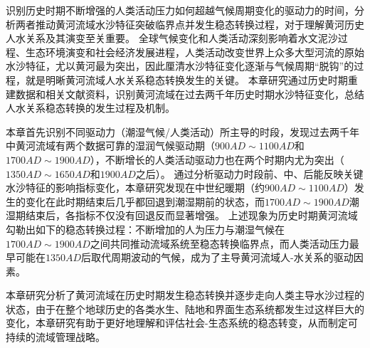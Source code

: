 识别历史时期不断增强的人类活动压力如何超越气候周期变化的驱动力的时间，分析两者推动黄河流域水沙特征突破临界点并发生稳态转换过程，对于理解黄河历史人水关系及其演变至关重要。
全球气候变化和人类活动深刻影响着水文泥沙过程、生态环境演变和社会经济发展进程，人类活动改变世界上众多大型河流的原始水沙特征，尤以黄河最为突出，因此厘清水沙特征变化逐渐与气候周期“脱钩”的过程，就是明晰黄河流域人水关系稳态转换发生的关键。
本章研究通过历史时期重建数据和相关文献资料，识别黄河流域在过去两千年历史时期水沙特征变化，总结人水关系稳态转换的发生过程及机制。

本章首先识别不同驱动力（潮湿气候/人类活动）所主导的时段，发现过去两千年中黄河流域有两个数据可靠的湿润气候驱动期（$900AD\sim1100AD$和$1700AD\sim1900AD$），不断增长的人类活动驱动力也在两个时期内尤为突出（$1350AD \sim 1650AD$和$1900AD$之后）。
通过分析驱动力时段前、中、后能反映关键水沙特征的影响指标变化，本章研究发现在中世纪暖期（约$900AD \sim 1100AD$）发生的变化在此时期结束后几乎都回退到潮湿期前的状态，而$1700AD \sim 1900AD$潮湿期结束后，各指标不仅没有回退反而显著增强。
上述现象为历史时期黄河流域勾勒出如下的稳态转换过程：不断增加的人为压力与潮湿气候在$1700AD \sim 1900AD$之间共同推动流域系统至稳态转换临界点，而人类活动压力最早可能在$1350AD$后取代周期波动的气候，成为了主导黄河流域人-水关系的驱动因素。

本章研究分析了黄河流域在历史时期发生稳态转换并逐步走向人类主导水沙过程的状态，由于在整个地球历史的各类水生、陆地和界面生态系统都发生过这样巨大的变化，本章研究有助于更好地理解和评估社会-生态系统的稳态转变，从而制定可持续的流域管理战略。
